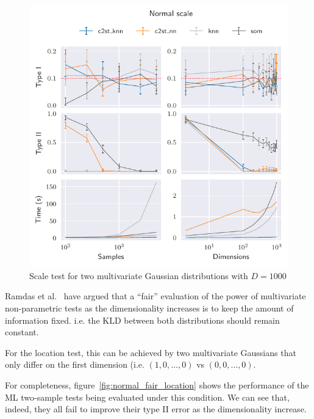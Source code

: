 \begin{figure}[htbp]
    \centering
    \includegraphics{images/6_som/normal_scale}
    \caption{Scale test for two multivariate Gaussian distributions with $D=1000$}
    \label{fig:normal_scale}
\end{figure}

Ramdas et al.~\cite{ramdas2015decreasing} have argued that a ``fair'' evaluation of the
power of multivariate non-parametric tests as the dimensionality increases is to keep the
amount of information fixed. i.e. the \gls{KLD} between both distributions
should remain constant.

For the location test, this can be achieved by two multivariate Gaussians that only differ
on the first dimension (i.e. $(1, 0, \ldots, 0)$ vs $(0, 0, \ldots, 0)$.

For completeness, figure~\ref{fig:normal_fair_location} shows the performance of the ML two-sample
tests being evaluated under this condition. We can see that, indeed, they all fail to improve
their type II error as the dimensionality increase.


